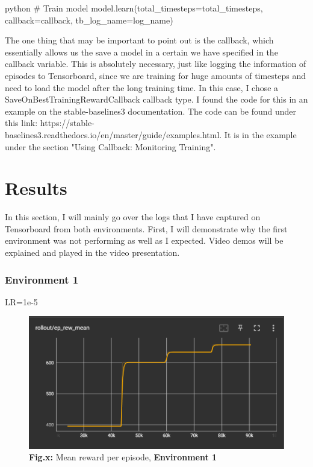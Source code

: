 \documentclass{article}
\numberwithin{equation}{section}
\numberwithin{equation}{section}
\begin{document}
\begin{mintedbox}{python}
# Train model
model.learn(total_timesteps=total_timesteps, callback=callback, tb_log_name=log_name)
\end{mintedbox}

The one thing that may be important to point out is the callback, which essentially allows us the save a model in a certain we have specified in the callback variable. This is absolutely necessary, just like logging the information of episodes to Tensorboard, since we are training for huge amounts of timesteps and need to load the model after the long training time. In this case, I chose a SaveOnBestTrainingRewardCallback callback type. I found the code for this in an example on the stable-baselines3 documentation. The code can be found under this link: https://stable-baselines3.readthedocs.io/en/master/guide/examples.html. It is in the example under the section "Using Callback: Monitoring Training".






\section*{Results}
In this section, I will mainly go over the logs that I have captured on Tensorboard from both environments. First, I will demonstrate why the first environment was not performing as well as I expected. Video demos will be explained and played in the video presentation.

\subsubsection*{Environment 1}
LR=1e-5
\begin{figure}[H]
	\centering
\includegraphics[width=\linewidth]{reward_env1.png}
	\\	
	\vspace{0.1in}
	\textbf{Fig.x:} Mean reward per episode, \textbf{Environment 1}
	\\
	\label{fig:Fig.3}
\end{figure}
\end{document}

